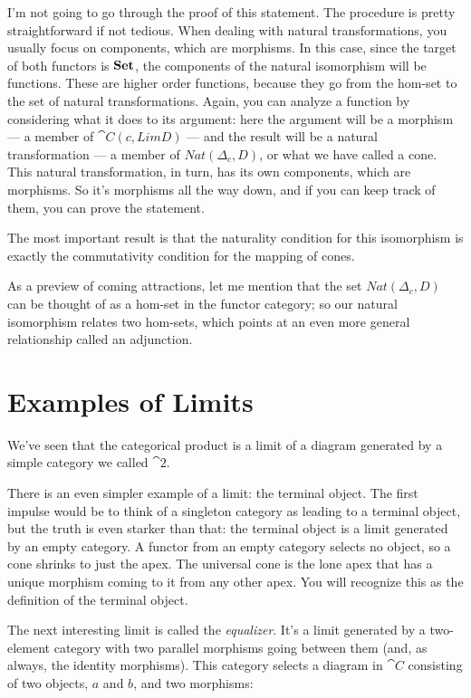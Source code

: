 I'm not going to go through the proof of this statement. The procedure
is pretty straightforward if not tedious. When dealing with natural
transformations, you usually focus on components, which are morphisms.
In this case, since the target of both functors is $\mathbf{Set}$, the
components of the natural isomorphism will be functions. These are
higher order functions, because they go from the hom-set to the set of
natural transformations. Again, you can analyze a function by
considering what it does to its argument: here the argument will be a
morphism --- a member of $\cat{C}(c, Lim D)$ --- and the result will
be a natural transformation --- a member of $Nat(\Delta_c, D)$, or
what we have called a cone. This natural transformation, in turn, has
its own components, which are morphisms. So it's morphisms all the way
down, and if you can keep track of them, you can prove the statement.

The most important result is that the naturality condition for this
isomorphism is exactly the commutativity condition for the mapping of
cones.

As a preview of coming attractions, let me mention that the set
$Nat(\Delta_c, D)$ can be thought of as a hom-set in the functor
category; so our natural isomorphism relates two hom-sets, which points
at an even more general relationship called an adjunction.

\section{Examples of Limits}\label{examples-of-limits}

We've seen that the categorical product is a limit of a diagram
generated by a simple category we called $\cat{2}$.

There is an even simpler example of a limit: the terminal object. The
first impulse would be to think of a singleton category as leading to a
terminal object, but the truth is even starker than that: the terminal
object is a limit generated by an empty category. A functor from an
empty category selects no object, so a cone shrinks to just the apex.
The universal cone is the lone apex that has a unique morphism coming to
it from any other apex. You will recognize this as the definition of the
terminal object.

The next interesting limit is called the \emph{equalizer}. It's a limit
generated by a two-element category with two parallel morphisms going
between them (and, as always, the identity morphisms). This category
selects a diagram in $\cat{C}$ consisting of two objects, $a$ and
$b$, and two morphisms:

